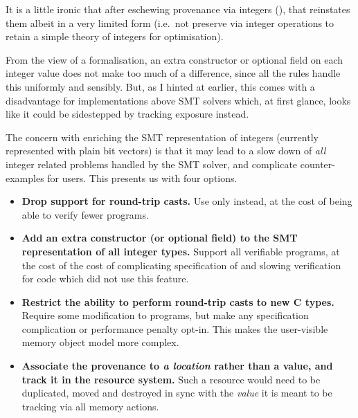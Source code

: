It is a little ironic that after eschewing provenance via integers (),
that  reinstates them albeit in a very limited form (i.e.\ not preserve
via integer operations to retain a simple theory of integers for optimisation).

From the view of a formalisation, an extra constructor or optional field on
each integer value does not make too much of a difference, since all the rules
handle this uniformly and sensibly. But, as I hinted at earlier, this comes
with a disadvantage for implementations above SMT solvers which, at first
glance, looks like it could be sidestepped by tracking exposure instead.

The concern with enriching the SMT representation of integers (currently
represented with plain bit vectors) is that it may lead to a slow down of
\emph{all} integer related problems handled by the SMT solver, and complicate
counter-examples for users. This presents us with four options.
\begin{itemize}
    \item \textbf{Drop support for round-trip casts.} Use only
         instead, at the cost of being able
        to verify fewer programs.
    \item \textbf{Add an extra constructor (or optional field) to the SMT
        representation of all integer types.} Support all  verifiable
        programs, at the cost of the cost of complicating specification of
        and slowing verification for code which did not use this feature.
    \item \textbf{Restrict the ability to perform round-trip casts to new C
        types.} Require some modification to  programs, but
        make any specification complication or performance penalty opt-in. This
        makes the user-visible memory object model more complex.\label{sn:optin-typedef-subtype}
    \item \textbf{Associate the provenance to \emph{a location} rather than a
        value, and track it in the resource system.} Such a resource would need
        to be duplicated, moved and destroyed in sync with the \emph{value} it
        is meant to be tracking via all memory actions.
\end{itemize}

